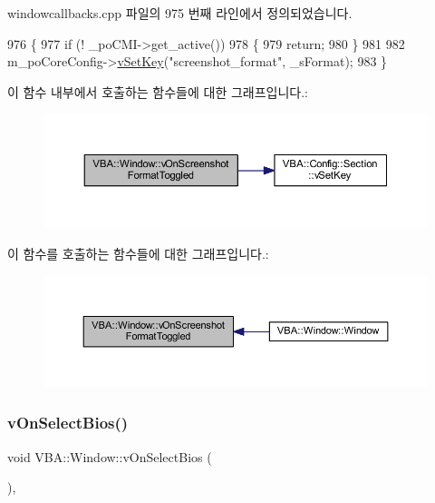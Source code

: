 windowcallbacks.\+cpp 파일의 975 번째 라인에서 정의되었습니다.


\begin{DoxyCode}
976 \{
977   \textcolor{keywordflow}{if} (! \_poCMI->get\_active())
978   \{
979     \textcolor{keywordflow}{return};
980   \}
981 
982   m\_poCoreConfig->\mbox{\hyperlink{class_v_b_a_1_1_config_1_1_section_a57e1b95cbea40db71c093381beff4b0e}{vSetKey}}(\textcolor{stringliteral}{"screenshot\_format"}, \_sFormat);
983 \}
\end{DoxyCode}
이 함수 내부에서 호출하는 함수들에 대한 그래프입니다.\+:
\nopagebreak
\begin{figure}[H]
\begin{center}
\leavevmode
\includegraphics[width=350pt]{class_v_b_a_1_1_window_a8536700b1c3ab6cd07b8fd14bf3d3d82_cgraph}
\end{center}
\end{figure}
이 함수를 호출하는 함수들에 대한 그래프입니다.\+:
\nopagebreak
\begin{figure}[H]
\begin{center}
\leavevmode
\includegraphics[width=350pt]{class_v_b_a_1_1_window_a8536700b1c3ab6cd07b8fd14bf3d3d82_icgraph}
\end{center}
\end{figure}
\mbox{\label{class_v_b_a_1_1_window_a5d20c67c2118e4a18e97cab4ba111c65}} 
\subsubsection{\texorpdfstring{v\+On\+Select\+Bios()}{vOnSelectBios()}}
{\footnotesize\ttfamily void V\+B\+A\+::\+Window\+::v\+On\+Select\+Bios (\begin{DoxyParamCaption}{ }\end{DoxyParamCaption})\hspace{0.3cm}{\ttfamily [protected]}, {\ttfamily [virtual]}}



